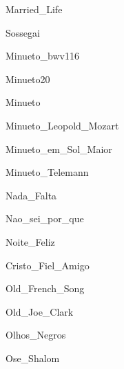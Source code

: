 \documentclass{scrartcl}
\begin{document}

{Married_Life}


{Sossegai}


{Minueto_bwv116}


{Minueto20}


{Minueto}


{Minueto_Leopold_Mozart}


{Minueto_em_Sol_Maior}


{Minueto_Telemann}


{Nada_Falta}


{Nao_sei_por_que}


{Noite_Feliz}


{Cristo_Fiel_Amigo}


{Old_French_Song}


{Old_Joe_Clark}


{Olhos_Negros}


{Ose_Shalom}
\end{document}
